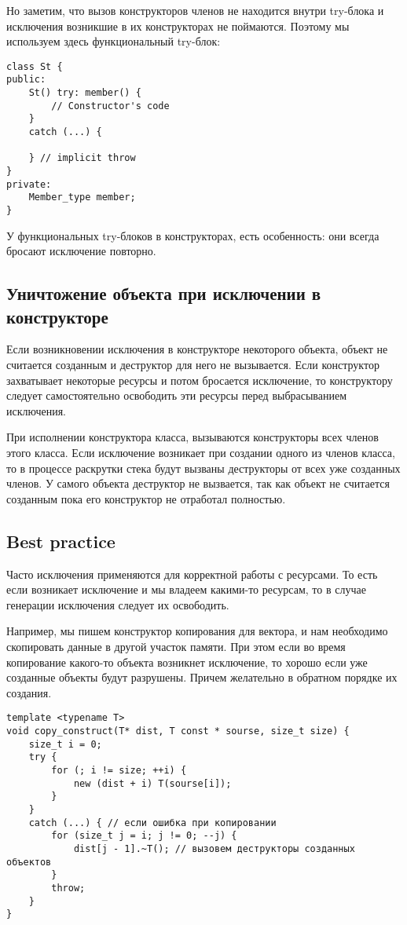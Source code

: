 Но заметим, что вызов конструкторов членов не находится внутри try-блока и исключения возникшие в их конструкторах не поймаются.
Поэтому мы используем здесь функциональный try-блок:

\begin{verbatim}
class St {
public:
    St() try: member() {
        // Constructor's code
    }
    catch (...) {

    } // implicit throw
}
private:
    Member_type member;
}
\end{verbatim}

У функциональных try-блоков в конструкторах, есть особенность: они всегда бросают исключение повторно.

\subsection{Уничтожение объекта при исключении в конструкторе}

Если возникновении исключения в конструкторе некоторого объекта, объект не считается созданным и деструктор для него не вызывается. Если конструктор захватывает некоторые ресурсы и потом бросается исключение, то конструктору следует самостоятельно освободить эти ресурсы перед выбрасыванием исключения.

При исполнении конструктора класса, вызываются конструкторы всех членов этого класса. Если исключение возникает при создании одного из членов класса, то в процессе раскрутки стека будут вызваны деструкторы от всех уже созданных членов. У самого объекта деструктор не вызвается, так как объект не считается созданным пока его конструктор не отработал полностью.

\subsection{Best practice}
Часто исключения применяются для корректной работы с ресурсами. То есть если возникает исключение и мы владеем какими-то ресурсам, то в случае генерации исключения следует их освободить.

Например, мы пишем конструктор копирования для вектора, и нам необходимо скопировать данные в другой участок памяти. При этом если во время копирование какого-то объекта возникнет исключение, то хорошо если уже созданные объекты будут разрушены. Причем желательно в обратном порядке их создания.
\begin{verbatim}
template <typename T>
void copy_construct(T* dist, T const * sourse, size_t size) {
    size_t i = 0;
    try {
        for (; i != size; ++i) {
            new (dist + i) T(sourse[i]);
        }
    }
    catch (...) { // если ошибка при копировании
        for (size_t j = i; j != 0; --j) {
            dist[j - 1].~T(); // вызовем деструкторы созданных объектов
        }
        throw;
    }
}
\end{verbatim}

